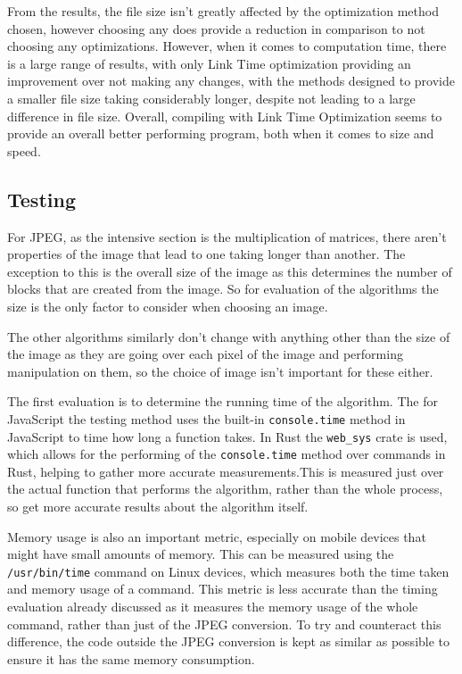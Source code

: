 \documentclass[12pt,a4paper]{article}
\begin{document}
From the results, the file size isn't greatly affected by the optimization method chosen, however choosing any does provide a reduction in comparison to not choosing any optimizations. However, when it comes to computation time, there is a large range of results, with only Link Time optimization providing an improvement over not making any changes, with the methods designed to provide a smaller file size taking considerably longer, despite not leading to a large difference in file size. Overall, compiling with Link Time Optimization seems to provide an overall better performing program, both when it comes to size and speed.



\subsection{Testing}

For JPEG, as the intensive section is the multiplication of matrices, there aren't properties of the image that lead to one taking longer than another. The exception to this is the overall size of the image as this determines the number of blocks that are created from the image. So for evaluation of the algorithms the size is the only factor to consider when choosing an image.

The other algorithms similarly don't change with anything other than the size of the image as they are going over each pixel of the image and performing manipulation on them, so the choice of image isn't important for these either.

The first evaluation is to determine the running time of the algorithm. The for JavaScript the testing method uses the built-in \texttt{console.time} method in JavaScript to time how long a function takes. In Rust the \texttt{web\_sys} crate is used, which allows for the performing of the \texttt{console.time} method over commands in Rust, helping to gather more accurate measurements.This is measured just over the actual function that performs the algorithm, rather than the whole process, so get more accurate results about the algorithm itself.

Memory usage is also an important metric, especially on mobile devices that might have small amounts of memory. This can be measured using the \texttt{/usr/bin/time} command on Linux devices, which measures both the time taken and memory usage of a command. This metric is less accurate than the timing evaluation already discussed as it measures the memory usage of the whole command, rather than just of the JPEG conversion. To try and counteract this difference, the code outside the JPEG conversion is kept as similar as possible to ensure it has the same memory consumption.
\end{document}
